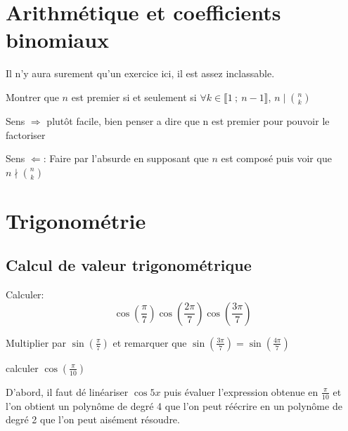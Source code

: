 \documentclass{article}
\begin{document}
\section{Arithmétique et coefficients binomiaux}
Il n'y aura surement qu'un exercice ici, il est assez inclassable. 
\begin{exercise}

  Montrer que $n$ est premier si et seulement si $\forall k \in \llbracket 1~;~n-1\rrbracket$, $n\mid\binom{n}{k}$
\end{exercise}

\begin{solution}

  Sens $\Rightarrow$ plutôt facile, bien penser a dire que n est premier pour pouvoir le factoriser

  Sens $\Leftarrow$:
  Faire par l'absurde en supposant que $n$ est composé puis voir que $n\nmid\binom{n}{k}$

\end{solution}

\section{Trigonométrie}
\subsection{Calcul de valeur trigonométrique }%
\label{sub:Calcul de valeur trigonométrique }

\begin{exercise}

  Calculer:
  \[\cos\left(\frac{\pi}{7}\right)\cos\left(\frac{2\pi}{7}\right)\cos\left(\frac{3\pi}{7}\right)\]
\end{exercise}

\begin{solution}

  Multiplier par $\sin\left(\frac{\pi}{7}\right)$ et remarquer que $\sin\left(\frac{3\pi}{7}\right) = \sin\left(\frac{4\pi}{7}\right)$

\end{solution}

\begin{exercise}
    calculer $\cos \left( \frac{\pi}{10} \right) $
\end{exercise}
\begin{solution}
    D'abord, il faut dé linéariser $\cos 5x$ puis évaluer l'expression obtenue en $\frac{\pi}{10}$ et l'on obtient un polynôme de degré 4 que l'on peut réécrire en un polynôme de degré 2 que l'on peut aisément résoudre.
\end{solution}
\end{document}
